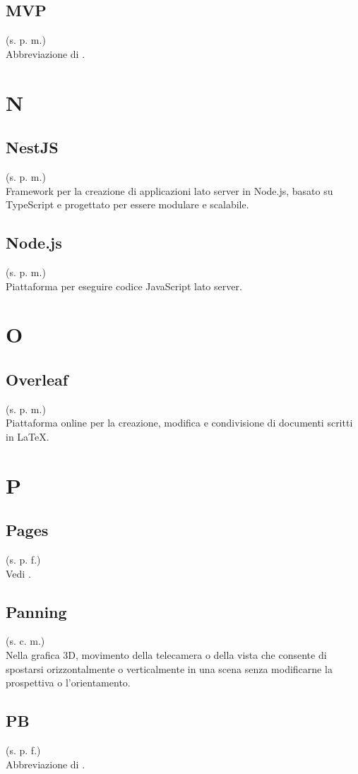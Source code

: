 \subsection{MVP}
(s. p. m.)\\
Abbreviazione di .
\pagebreak
\section{N}
\subsection{NestJS}
(s. p. m.)\\
Framework per la creazione di applicazioni lato server in Node.js,
basato su TypeScript e progettato per essere modulare e scalabile.
\subsection{Node.js}
(s. p. m.)\\
Piattaforma per eseguire codice JavaScript lato server.
\pagebreak
\section{O}
\subsection{Overleaf}
(s. p. m.)\\
Piattaforma online per la creazione, modifica e condivisione di documenti
scritti in LaTeX.
\pagebreak
\section{P}
\subsection{Pages}
(s. p. f.)\\
Vedi .
\subsection{Panning}
(s. c. m.)\\
Nella grafica 3D, movimento della telecamera o della vista che consente
di spostarsi orizzontalmente o verticalmente in una scena senza modificarne
la prospettiva o l'orientamento.
\subsection{PB}
\label{PB}
(s. p. f.)\\
Abbreviazione di .
